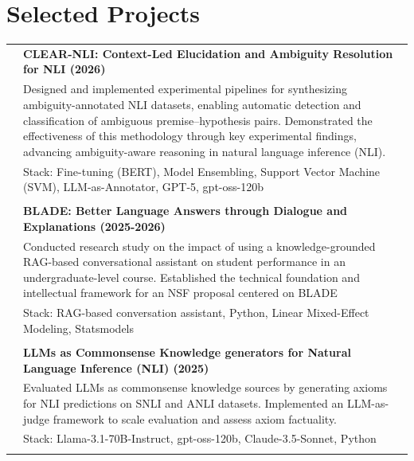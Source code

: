 \section{Selected Projects}
\begin{supertabular}{r|p{17.5cm}}


\emph{} & \normalsize \bf CLEAR-NLI: Context-Led Elucidation and Ambiguity Resolution for NLI (2026) \textsc{}  \\\textsc{}&\small{Designed and implemented experimental pipelines for synthesizing ambiguity-annotated NLI datasets, enabling automatic detection and classification of ambiguous premise–hypothesis pairs. Demonstrated the effectiveness of this methodology through key experimental findings, advancing ambiguity-aware reasoning in natural language inference (NLI).}\\&\footnotesize{Stack: Fine-tuning (BERT), Model Ensembling, Support Vector Machine (SVM), LLM-as-Annotator, GPT-5, gpt-oss-120b}\\\vspace{-.08in}\\

\emph{} & \normalsize \bf BLADE: Better Language Answers through Dialogue and Explanations (2025-2026) \textsc{}  \\\textsc{}&\small{Conducted research study on the impact of using a knowledge-grounded RAG-based conversational assistant on student performance in an undergraduate-level course. Established the technical foundation and intellectual framework for an NSF proposal centered on BLADE}\\&\footnotesize{Stack: RAG-based conversation assistant, Python, Linear Mixed-Effect Modeling, Statsmodels}\\ \vspace{-0.08in}\\ 

\emph{} & \normalsize \bf LLMs as Commonsense Knowledge generators for Natural Language Inference (NLI) (2025) \textsc{}  \\\textsc{}&\small{Evaluated LLMs as commonsense knowledge sources by generating axioms for NLI predictions on SNLI and ANLI datasets. Implemented an LLM-as-judge framework to scale evaluation and assess axiom factuality. 
}\\&\footnotesize{Stack: Llama-3.1-70B-Instruct, gpt-oss-120b, Claude-3.5-Sonnet, Python}\\ \vspace{-0.08in}\\



\end{supertabular}
